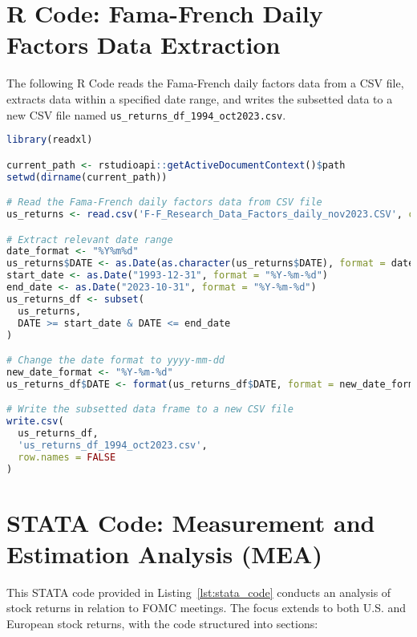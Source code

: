 



\section{R Code: Fama-French Daily Factors Data Extraction}
\label{app:r_code}

The following R Code reads the Fama-French daily factors data from a CSV file, extracts data within a specified date range, and writes the subsetted data to a new CSV file named \texttt{us\_returns\_df\_1994\_oct2023.csv}.

\begin{singlespace}

\begin{lstlisting}[language=R, caption={R Code for Fama-French Daily Factors Data Extraction}, label=lst:r_code]
library(readxl)

current_path <- rstudioapi::getActiveDocumentContext()$path
setwd(dirname(current_path))

# Read the Fama-French daily factors data from CSV file
us_returns <- read.csv('F-F_Research_Data_Factors_daily_nov2023.CSV', col.names = c("DATE", "Mkt-RF", "SMB", "HML", "RF"), skip = 4)

# Extract relevant date range
date_format <- "%Y%m%d"
us_returns$DATE <- as.Date(as.character(us_returns$DATE), format = date_format)
start_date <- as.Date("1993-12-31", format = "%Y-%m-%d")
end_date <- as.Date("2023-10-31", format = "%Y-%m-%d")
us_returns_df <- subset(
  us_returns,
  DATE >= start_date & DATE <= end_date
)

# Change the date format to yyyy-mm-dd
new_date_format <- "%Y-%m-%d"
us_returns_df$DATE <- format(us_returns_df$DATE, format = new_date_format)

# Write the subsetted data frame to a new CSV file
write.csv(
  us_returns_df,
  'us_returns_df_1994_oct2023.csv',
  row.names = FALSE
)
\end{lstlisting}
\end{singlespace}


\section{STATA Code: Measurement and Estimation Analysis (MEA)}
\label{app:stata_code}

This STATA code provided in Listing~\ref{lst:stata_code} conducts an analysis of stock returns in relation to FOMC meetings. The focus extends to both U.S. and European stock returns, with the code structured into sections:

